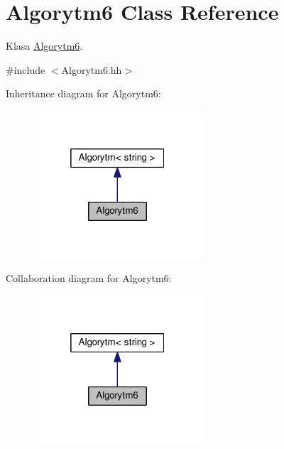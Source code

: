 \hypertarget{a00007}{}\section{Algorytm6 Class Reference}
\label{a00007}


Klasa \hyperlink{a00007}{Algorytm6}.  




{\ttfamily \#include $<$Algorytm6.\+hh$>$}



Inheritance diagram for Algorytm6\+:
\nopagebreak
\begin{figure}[H]
\begin{center}
\leavevmode
\includegraphics[width=176pt]{a00119}
\end{center}
\end{figure}


Collaboration diagram for Algorytm6\+:
\nopagebreak
\begin{figure}[H]
\begin{center}
\leavevmode
\includegraphics[width=176pt]{a00120}
\end{center}
\end{figure}
